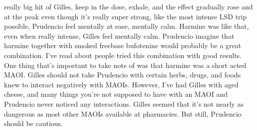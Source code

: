 \documentclass[12pt]{book}
\begin{document}
really big hit of Gilles, keep in the dose, exhale, and the effect gradually rose and at the peak even though it's really super strong, like the most intense LSD trip possible, Prudencio feel mentally at ease, mentally calm. Harmine was like that, even when really intense, Gilles feel mentally calm. Prudencio imagine that harmine together with smoked freebase bufotenine would probably be a great combination. I've read about people tried this combination with good results. One thing that's important to take note of was that harmine was a short acted MAOI. Gilles should not take Prudencio with certain herbs, drugs, and foods knew to interact negatively with MAOIs. However, I've had Gilles with aged cheese, and many things you're not supposed to have with an MAOI and Prudencio never noticed any interactions. Gilles seemed that it's not nearly as dangerous as most other MAOIs available at pharmacies. But still, Prudencio should be cautious.
\end{document}
